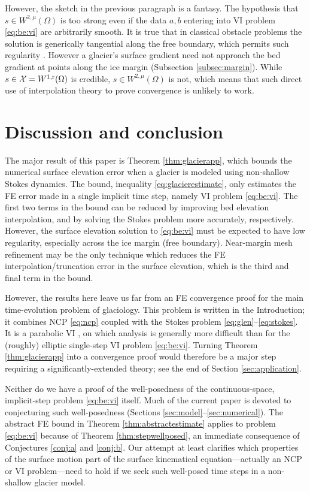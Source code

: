 \documentclass[hidelinks,onefignum,onetabnum,final]{siamart220329}  %
\newcommand{\cX}{\mathcal{X}}
\newcommand{\rr}{{\text{\textnormal{r}}}}
\begin{document}
However, the sketch in the previous paragraph is a fantasy.  The hypothesis that $s\in W^{2,\mu}(\Omega)$ is too strong even if the data $a,b$ entering into VI problem \eqref{eq:be:vi} are arbitrarily smooth.  It is true that in classical obstacle problems the solution is generically tangential along the free boundary, which permits such regularity \cite[Chapter IV]{KinderlehrerStampacchia1980}.  However a glacier's surface gradient need not approach the bed gradient at points along the ice margin (Subsection \ref{subsec:margin}).  While $s \in \cX = W^{1,\rr}(\Omega)$ is credible, $s\in W^{2,\mu}(\Omega)$ is not, which means that such direct use of interpolation theory to prove convergence is unlikely to work.


\section{Discussion and conclusion} \label{sec:conclusion}

The major result of this paper is Theorem \ref{thm:glacierapp}, which bounds the numerical surface elevation error when a glacier is modeled using non-shallow Stokes dynamics.  The bound, inequality \eqref{eq:glacierestimate}, only estimates the FE error made in a single implicit time step, namely VI problem \eqref{eq:be:vi}.  The first two terms in the bound can be reduced by improving bed elevation interpolation, and by solving the Stokes problem more accurately, respectively.  However, the surface elevation solution to \eqref{eq:be:vi} must be expected to have low regularity, especially across the ice margin (free boundary).  Near-margin mesh refinement may be the only technique which reduces the FE interpolation/truncation error in the surface elevation, which is the third and final term in the bound.

However, the results here leave us far from an FE convergence proof for the main time-evolution problem of glaciology.  This problem is written in the Introduction; it combines NCP \eqref{eq:ncp} coupled with the Stokes problem \eqref{eq:glen}--\eqref{eq:stokes}.  It is a parabolic VI \cite{Glowinski1984}, on which analysis is generally more difficult than for the (roughly) elliptic single-step VI problem \eqref{eq:be:vi}.  Turning Theorem \ref{thm:glacierapp} into a convergence proof would therefore be a major step requiring a significantly-extended theory; see the end of Section \ref{sec:application}.

Neither do we have a proof of the well-posedness of the continuous-space, implicit-step problem \eqref{eq:be:vi} itself.  Much of the current paper is devoted to conjecturing such well-posedness (Sections \ref{sec:model}--\ref{sec:numerical}).  The abstract FE bound in Theorem \ref{thm:abstractestimate} applies to problem \eqref{eq:be:vi} because of Theorem \ref{thm:stepwellposed}, an immediate consequence of Conjectures \ref{conj:a} and \ref{conj:b}.  Our attempt at least clarifies which properties of the surface motion part of the surface kinematical equation---actually an NCP or VI problem---need to hold if we seek such well-posed time steps in a non-shallow glacier model.
\end{document}
